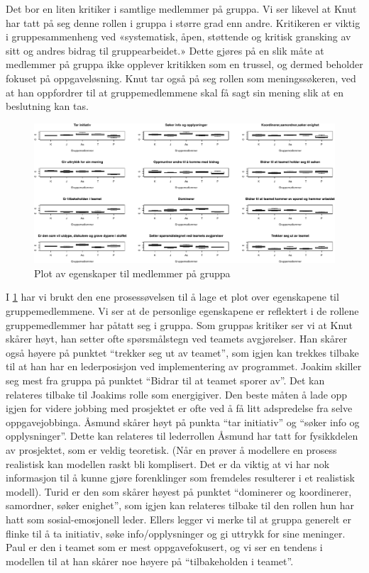 Det bor en liten kritiker i samtlige medlemmer på gruppa. Vi ser likevel at Knut har tatt på 
seg denne rollen i gruppa i større grad enn andre. Kritikeren er viktig i gruppesammenheng 
ved «systematisk, åpen, støttende og kritisk gransking av sitt og andres bidrag til gruppearbeidet.»
Dette gjøres på en slik måte at medlemmer på gruppa ikke opplever kritikken som en trussel, 
og dermed beholder fokuset på oppgaveløsning. Knut tar også på seg rollen som meningssøkeren, 
ved at han oppfordrer til at gruppemedlemmene skal få sagt sin mening slik at en beslutning
kan tas.

\begin{figure}[ht!]
\centering
\includegraphics[scale=0.4]{teammedlem.pdf}
\caption{Plot av egenskaper til medlemmer på gruppa}
\label{fig:medlemmer}
\end{figure}

I \cref{fig:medlemmer} har vi brukt den ene prosessøvelsen til å
lage et plot over egenskapene til gruppemedlemmene. Vi ser at de personlige
 egenskapene er reflektert i de rollene gruppemedlemmer har påtatt seg i gruppa. Som gruppas
kritiker ser vi at Knut skårer høyt, han setter ofte spørsmålstegn ved teamets avgjørelser. 
Han skårer også høyere på punktet ``trekker seg ut av teamet'', som igjen kan trekkes tilbake 
til at han har en lederposisjon ved implementering av
programmet. Joakim skiller seg mest fra gruppa på punktet ``Bidrar til at teamet 
sporer av''. Det kan relateres tilbake til Joakims rolle som energigiver. Den beste måten å lade opp igjen
for videre jobbing med prosjektet er ofte ved å få litt adspredelse fra selve oppgavejobbinga.
Åsmund skårer høyt på punkta ``tar initiativ'' og ``søker info og opplysninger''. 
Dette kan relateres til lederrollen Åsmund har tatt for fysikkdelen av prosjektet,
som er veldig teoretisk. (Når en prøver å modellere en prosess realistisk kan
modellen raskt bli komplisert. Det er da viktig at vi har nok informasjon til å
kunne gjøre forenklinger som fremdeles resulterer i et realistisk modell).
Turid er den som skårer høyest på punktet ``dominerer og koordinerer, samordner, søker
enighet'', som igjen kan relateres tilbake til den rollen hun har hatt som
sosial-emosjonell leder. Ellers legger vi merke til at gruppa
generelt er flinke til å ta initiativ, søke info/opplysninger og gi uttrykk for sine meninger. Paul
er den i teamet som er mest oppgavefokusert, og vi ser en tendens i modellen til
at han skårer noe høyere på ``tilbakeholden i teamet''.

